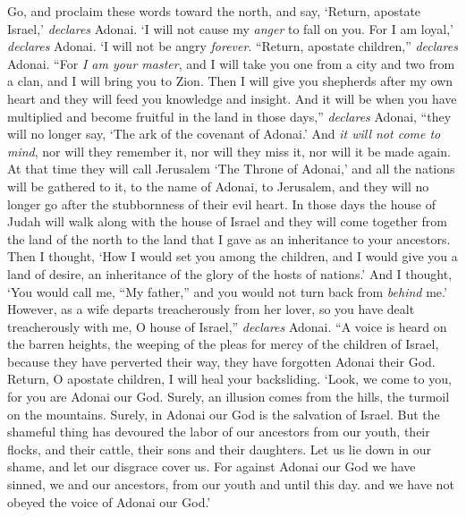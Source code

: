 \begin{biblechapter}
\verse Go, and proclaim these words toward the north, and say,
\verse ‘Return, apostate Israel,’ \textit{declares} Adonai. 
‘I will not cause my \textit{anger} to fall on you. 
For I am loyal,’ \textit{declares} Adonai. 
‘I will not be angry \textit{forever}.
\verse “Return, apostate children,” \textit{declares} Adonai. “For \textit{I am your master}, and I will take you one from a city and two from a clan, and I will bring you to Zion.
\verse Then I will give you shepherds after my own heart and they will feed you knowledge and insight.
\verse And it will be when you have multiplied and become fruitful in the land in those days,” \textit{declares} Adonai, “they will no longer say, ‘The ark of the covenant of Adonai.’ And \textit{it will not come to mind}, nor will they remember it, nor will they miss it, nor will it be made again.
\verse At that time they will call Jerusalem ‘The Throne of Adonai,’ and all the nations will be gathered to it, to the name of Adonai, to Jerusalem, and they will no longer go after the stubbornness of their evil heart.
\verse In those days the house of Judah will walk along with the house of Israel and they will come together from the land of the north to the land that I gave as an inheritance to your ancestors.
\verse Then I thought, ‘How I would set you among the children, 
and I would give you a land of desire, 
an inheritance of the glory of the hosts of nations.’ 
And I thought, ‘You would call me, “My father,” 
and you would not turn back from \textit{behind} me.’
\verse However, as a wife departs treacherously from her lover, 
so you have dealt treacherously with me, 
O house of Israel,” \textit{declares} Adonai.
\verse “A voice is heard on the barren heights, 
the weeping of the pleas for mercy of the children of Israel, 
because they have perverted their way, 
they have forgotten Adonai their God.
\verse Return, O apostate children, 
I will heal your backsliding. 
‘Look, we come to you, 
for you are Adonai our God.
\verse Surely, an illusion comes from the hills, 
the turmoil on the mountains. 
Surely, in Adonai our God 
is the salvation of Israel.
\verse But the shameful thing has devoured 
the labor of our ancestors from our youth, 
their flocks, and their cattle, 
their sons and their daughters.
\verse Let us lie down in our shame, 
and let our disgrace cover us. 
For against Adonai our God we have sinned, 
we and our ancestors, 
from our youth and until this day. 
and we have not obeyed the voice of Adonai our God.’
\end{biblechapter}

